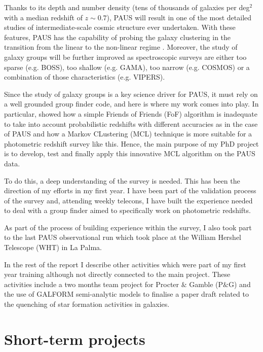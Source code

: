 \documentclass[11pt]{article}
\begin{document}
Thanks to its depth and number density (tens of thousands of galaxies per deg$^2$ with a median redshift of $z \sim 0.7$), PAUS will result in one of the most detailed studies of intermediate-scale cosmic structure ever undertaken. With these features, PAUS has the capability of probing the galaxy clustering in the transition from the linear to the non-linear regime \citep{stothert18_thesis}. Moreover, the study of galaxy groups will be further improved as spectroscopic surveys are either too sparse (e.g. BOSS), too shallow (e.g. GAMA), too narrow (e.g. COSMOS) or a combination of those characteristics (e.g. VIPERS).

Since the study of galaxy groups is a key science driver for PAUS, it must rely on a well grounded group finder code, and here is where my work comes into play. In particular, \cite{stothert18_thesis} showed how a simple Friends of Friends (FoF) algorithm is inadequate to take into account probabilistic redshifts with different accuracies as in the case of PAUS and how a Markov CLustering (MCL) technique is more suitable for a photometric redshift survey like this. Hence, the main purpose of my PhD project is to develop, test and finally apply this innovative MCL algorithm on the PAUS data. 

To do this, a deep understanding of the survey is needed. This has been the direction of my efforts in my first year. I have been part of the validation process of the survey and, attending weekly telecons, I have built the experience needed to deal with a group finder aimed to specifically work on photometric redshifts. 

As part of the process of building experience within the survey, I also took part to the last PAUS observational run which took place at the William Hershel Telescope (WHT) in La Palma. 

In the rest of the report I describe other activities which were part of my first year training although not directly connected to the main project. These activities include a two months team project for Procter $\&$ Gamble (P$\&$G) and the use of GALFORM semi-analytic models to finalise a paper draft related to the quenching of star formation activities in galaxies.




\section{Short-term projects}
\label{sec:short}
\end{document}

